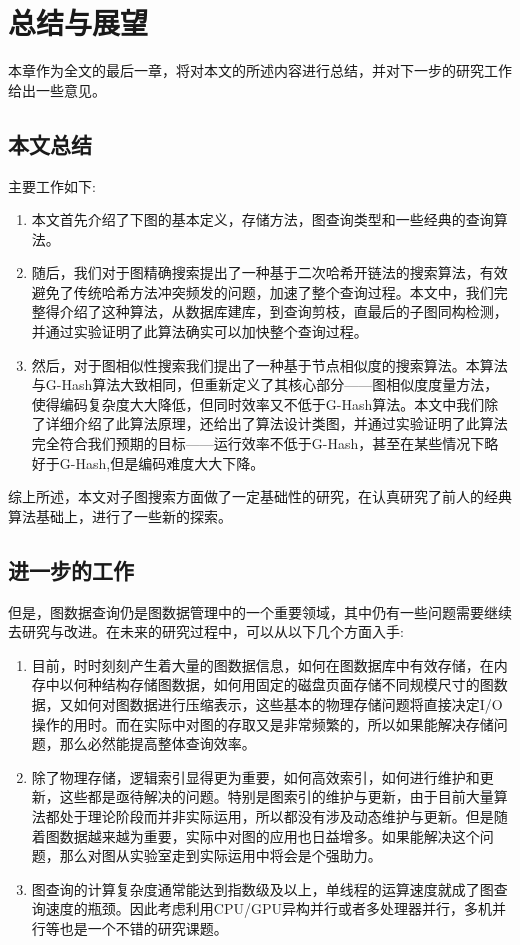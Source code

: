 \documentclass{XDBAthesis}
\begin{document}
\else
\fi
\chapter{总结与展望}
\label{chap:future}
本章作为全文的最后一章，将对本文的所述内容进行总结，并对下一步的研究工作给出一些意见。
\section{本文总结}
主要工作如下:
\begin{enumerate}
    \item 本文首先介绍了下图的基本定义，存储方法，图查询类型和一些经典的查询算法。
    \item 随后，我们对于图精确搜索提出了一种基于二次哈希开链法的搜索算法，有效避免了传统哈希方法冲突频发的问题，加速了整个查询过程。本文中，我们完整得介绍了这种算法，从数据库建库，到查询剪枝，直最后的子图同构检测，并通过实验证明了此算法确实可以加快整个查询过程。
    \item 然后，对于图相似性搜索我们提出了一种基于节点相似度的搜索算法。本算法与G-Hash算法大致相同，但重新定义了其核心部分——图相似度度量方法，使得编码复杂度大大降低，但同时效率又不低于G-Hash算法。本文中我们除了详细介绍了此算法原理，还给出了算法设计类图，并通过实验证明了此算法完全符合我们预期的目标——运行效率不低于G-Hash，甚至在某些情况下略好于G-Hash,但是编码难度大大下降。
\end{enumerate}

综上所述，本文对子图搜索方面做了一定基础性的研究，在认真研究了前人的经典算法基础上，进行了一些新的探索。
\section{进一步的工作}
但是，图数据查询仍是图数据管理中的一个重要领域，其中仍有一些问题需要继续去研究与改进。在未来的研究过程中，可以从以下几个方面入手:
\begin{enumerate}
    \item 目前，时时刻刻产生着大量的图数据信息，如何在图数据库中有效存储，在内存中以何种结构存储图数据，如何用固定的磁盘页面存储不同规模尺寸的图数据，又如何对图数据进行压缩表示，这些基本的物理存储问题将直接决定I/O操作的用时。而在实际中对图的存取又是非常频繁的，所以如果能解决存储问题，那么必然能提高整体查询效率。
    \item 除了物理存储，逻辑索引显得更为重要，如何高效索引，如何进行维护和更新，这些都是亟待解决的问题。特别是图索引的维护与更新，由于目前大量算法都处于理论阶段而并非实际运用，所以都没有涉及动态维护与更新。但是随着图数据越来越为重要，实际中对图的应用也日益增多。如果能解决这个问题，那么对图从实验室走到实际运用中将会是个强助力。
    \item 图查询的计算复杂度通常能达到指数级及以上，单线程的运算速度就成了图查询速度的瓶颈。因此考虑利用CPU/GPU异构并行或者多处理器并行，多机并行等也是一个不错的研究课题。
\end{enumerate}


\ifx\allfiles\undefined
%

\end{document}
